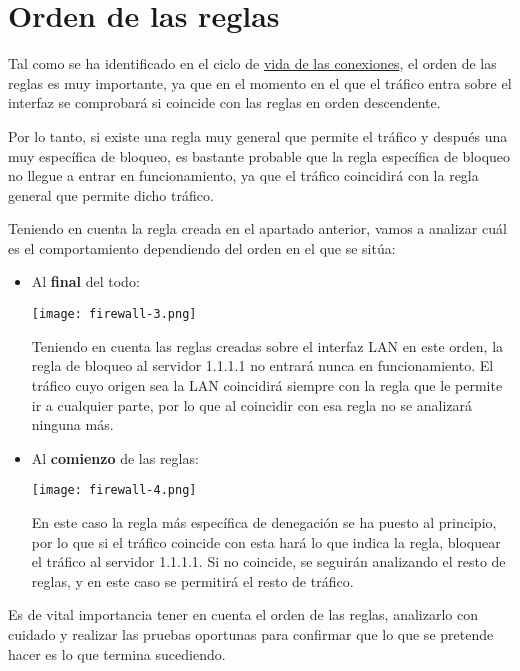 \section{Orden de las reglas}
Tal como se ha identificado en el ciclo de \hyperlink{ciclo_vida_conexiones}{vida de las conexiones}, el orden de las reglas es muy importante, ya que en el momento en el que el tráfico entra sobre el interfaz se comprobará si coincide con las reglas en orden descendente.

Por lo tanto, si existe una regla muy general que permite el tráfico y después una muy específica de bloqueo, es bastante probable que la regla específica de bloqueo no llegue a entrar en funcionamiento, ya que el tráfico coincidirá con la regla general que permite dicho tráfico.

Teniendo en cuenta la regla creada en el apartado anterior, vamos a analizar cuál es el comportamiento dependiendo del orden en el que se sitúa:

\begin{itemize}
    \item Al \textbf{final} del todo:
    \begin{center}
        \texttt{[image: firewall-3.png]}
    \end{center}
    Teniendo en cuenta las reglas creadas sobre el interfaz LAN en este orden, la regla de bloqueo al servidor 1.1.1.1 no entrará nunca en funcionamiento. El tráfico cuyo origen sea la LAN coincidirá siempre con la regla que le permite ir a cualquier parte, por lo que al coincidir con esa regla no se analizará ninguna más.

    \item Al \textbf{comienzo} de las reglas:
    \begin{center}
        \texttt{[image: firewall-4.png]}
    \end{center}
    En este caso la regla más específica de denegación se ha puesto al principio, por lo que si el tráfico coincide con esta hará lo que indica la regla, bloquear el tráfico al servidor 1.1.1.1. Si no coincide, se seguirán analizando el resto de reglas, y en este caso se permitirá el resto de tráfico.
\end{itemize}

Es de vital importancia tener en cuenta el orden de las reglas, analizarlo con cuidado y realizar las pruebas oportunas para confirmar que lo que se pretende hacer es lo que termina sucediendo.


